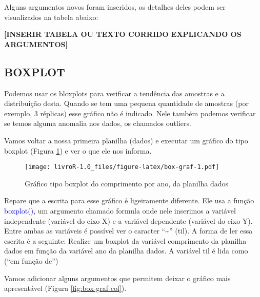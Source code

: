 \documentclass[titlepage, oneside, openany, a4paper]{book}
\newenvironment{Shaded}{\begin{snugshade}}{\end{snugshade}}
\newcommand{\DataTypeTok}[1]{\textcolor[rgb]{0.13,0.29,0.53}{#1}}
\newcommand{\KeywordTok}[1]{\textcolor[rgb]{0.13,0.29,0.53}{\textbf{#1}}}
\newcommand{\NormalTok}[1]{#1}
\newcommand{\OperatorTok}[1]{\textcolor[rgb]{0.81,0.36,0.00}{\textbf{#1}}}
\newcommand{\StringTok}[1]{\textcolor[rgb]{0.31,0.60,0.02}{#1}}
\begin{document}
Alguns argumentos novos foram inseridos, os detalhes deles podem ser visualizados na tabela abaixo:

\textbf{{[}INSERIR TABELA OU TEXTO CORRIDO EXPLICANDO OS ARGUMENTOS{]}}

\hypertarget{boxplot}{%
\subsection{BOXPLOT}\label{boxplot}}

Podemos usar os bloxplots para verificar a tendência das amostras e a distribuição desta. Quando se tem uma pequena quantidade de amostras (por exemplo, 3 réplicas) esse gráfico não é indicado. Nele também podemos verificar se temos alguma anomalia nos dados, os chamados outliers.

Vamos voltar a nossa primeira planilha (dados) e executar um gráfico do tipo boxplot (Figura \ref{fig:box-graf}) e ver o que ele nos informa.

\begin{Shaded}
\end{Shaded}

\begin{figure}
\centering
\texttt{[image: livroR-1.0\_files/figure-latex/box-graf-1.pdf]}
\caption{\label{fig:box-graf}Gráfico tipo boxplot do comprimento por ano, da planilha dados}
\end{figure}

Repare que a escrita para esse gráfico é ligeiramente diferente. Ele usa a função \textcolor{blue}{boxplot()}, um argumento chamado formula onde nele inserimos a variável independente (variável do eixo X) e a variável dependente (variável do eixo Y). Entre ambas as variáveis é possível ver o caracter ``\textasciitilde{}'' (til). A forma de ler essa escrita é a seguinte: Realize um boxplot da variável comprimento da planilha dados em função da variável ano da planilha dados. A variável til é lida como (``em função de'')

Vamos adicionar alguns argumentos que permitem deixar o gráfico mais apresentável (Figura \ref{fig:box-graf-col}).

\begin{Shaded}
\end{Shaded}
\end{document}
